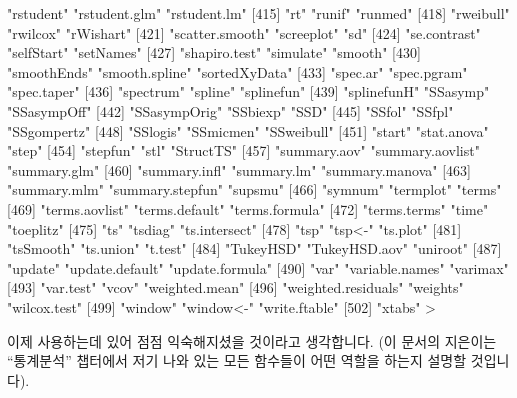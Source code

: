 \begin{Schunk}
\begin{Soutput}
[412] "rstudent"             "rstudent.glm"         "rstudent.lm"         
[415] "rt"                   "runif"                "runmed"              
[418] "rweibull"             "rwilcox"              "rWishart"            
[421] "scatter.smooth"       "screeplot"            "sd"                  
[424] "se.contrast"          "selfStart"            "setNames"            
[427] "shapiro.test"         "simulate"             "smooth"              
[430] "smoothEnds"           "smooth.spline"        "sortedXyData"        
[433] "spec.ar"              "spec.pgram"           "spec.taper"          
[436] "spectrum"             "spline"               "splinefun"           
[439] "splinefunH"           "SSasymp"              "SSasympOff"          
[442] "SSasympOrig"          "SSbiexp"              "SSD"                 
[445] "SSfol"                "SSfpl"                "SSgompertz"          
[448] "SSlogis"              "SSmicmen"             "SSweibull"           
[451] "start"                "stat.anova"           "step"                
[454] "stepfun"              "stl"                  "StructTS"            
[457] "summary.aov"          "summary.aovlist"      "summary.glm"         
[460] "summary.infl"         "summary.lm"           "summary.manova"      
[463] "summary.mlm"          "summary.stepfun"      "supsmu"              
[466] "symnum"               "termplot"             "terms"               
[469] "terms.aovlist"        "terms.default"        "terms.formula"       
[472] "terms.terms"          "time"                 "toeplitz"            
[475] "ts"                   "tsdiag"               "ts.intersect"        
[478] "tsp"                  "tsp<-"                "ts.plot"             
[481] "tsSmooth"             "ts.union"             "t.test"              
[484] "TukeyHSD"             "TukeyHSD.aov"         "uniroot"             
[487] "update"               "update.default"       "update.formula"      
[490] "var"                  "variable.names"       "varimax"             
[493] "var.test"             "vcov"                 "weighted.mean"       
[496] "weighted.residuals"   "weights"              "wilcox.test"         
[499] "window"               "window<-"             "write.ftable"        
[502] "xtabs"               
> 
\end{Soutput}
\end{Schunk}

이제 사용하는데 있어 점점 익숙해지셨을 것이라고 생각합니다. (이 문서의 지은이는 ``통계분석'' 챕터에서 저기 나와 있는 모든 함수들이 어떤 역할을 하는지 설명할 것입니다).

